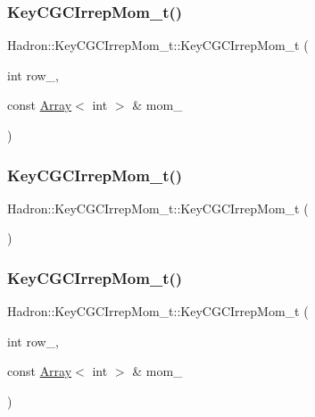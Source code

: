 \subsubsection{\texorpdfstring{KeyCGCIrrepMom\_t()}{KeyCGCIrrepMom\_t()}\hspace{0.1cm}{\footnotesize\ttfamily [2/6]}}
{\footnotesize\ttfamily Hadron\+::\+Key\+C\+G\+C\+Irrep\+Mom\+\_\+t\+::\+Key\+C\+G\+C\+Irrep\+Mom\+\_\+t (\begin{DoxyParamCaption}\item[{int}]{row\+\_\+,  }\item[{const \mbox{\hyperlink{classXMLArray_1_1Array}{Array}}$<$ int $>$ \&}]{mom\+\_\+ }\end{DoxyParamCaption})\hspace{0.3cm}{\ttfamily [inline]}}

\mbox{\label{structHadron_1_1KeyCGCIrrepMom__t_aa3965e02d80a6c483de3e253a4de7826}} 
\subsubsection{\texorpdfstring{KeyCGCIrrepMom\_t()}{KeyCGCIrrepMom\_t()}\hspace{0.1cm}{\footnotesize\ttfamily [3/6]}}
{\footnotesize\ttfamily Hadron\+::\+Key\+C\+G\+C\+Irrep\+Mom\+\_\+t\+::\+Key\+C\+G\+C\+Irrep\+Mom\+\_\+t (\begin{DoxyParamCaption}{ }\end{DoxyParamCaption})\hspace{0.3cm}{\ttfamily [inline]}}

\mbox{\label{structHadron_1_1KeyCGCIrrepMom__t_a467e3ce4ab08bc6438ac855240bead31}} 
\subsubsection{\texorpdfstring{KeyCGCIrrepMom\_t()}{KeyCGCIrrepMom\_t()}\hspace{0.1cm}{\footnotesize\ttfamily [4/6]}}
{\footnotesize\ttfamily Hadron\+::\+Key\+C\+G\+C\+Irrep\+Mom\+\_\+t\+::\+Key\+C\+G\+C\+Irrep\+Mom\+\_\+t (\begin{DoxyParamCaption}\item[{int}]{row\+\_\+,  }\item[{const \mbox{\hyperlink{classXMLArray_1_1Array}{Array}}$<$ int $>$ \&}]{mom\+\_\+ }\end{DoxyParamCaption})\hspace{0.3cm}{\ttfamily [inline]}}


